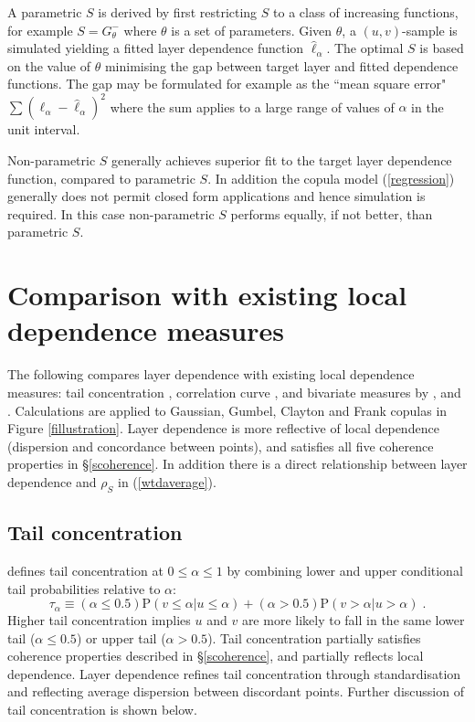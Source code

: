 \documentclass[authoryear]{elsarticle}
\newcommand{\p}{\mathrm{P}}
\newcommand{\eref}[1]{(\ref{#1})}
\newcommand{\fref}[1]{Figure \ref{#1}}
\newcommand{\sref}[1]{\S\ref{#1}}
\begin{document}
A parametric $S$ is derived by first restricting $S$ to a class of increasing functions, for example $S=G^-_\theta$ where $\theta$ is a set of parameters. Given $\theta$, a $(u,v)$-sample is simulated yielding a fitted layer dependence function $\hat{\ell}_\alpha$. The optimal $S$ is based on the value of $\theta$ minimising the gap between target layer and fitted dependence functions. The gap may be formulated for example as the ``mean square error" $\sum (\ell_\alpha-\hat{\ell}_\alpha)^2$ where the sum applies to a large range of values of $\alpha$ in the unit interval.

Non-parametric $S$ generally achieves superior fit to the target layer dependence function, compared to parametric $S$. In addition the copula model \eref{regression} generally does not permit closed form applications and hence simulation is required. In this case non-parametric $S$ performs equally, if not better, than parametric $S$.



\section{Comparison with existing local dependence measures}\label{sliterature}

The following compares layer dependence with existing local dependence measures: tail concentration \citep{venter2002tails}, correlation curve \citep{bjerve1993correlation}, and bivariate measures by \cite{bairamov2003new}, \cite{jones1996local} and \cite{holland1987dependence}. Calculations are applied to Gaussian, Gumbel, Clayton and Frank copulas in \fref{fillustration}. Layer dependence is more reflective of local dependence (dispersion and concordance between points), and satisfies all five coherence properties in \sref{scoherence}. In addition there is a direct relationship between layer dependence and  $\rho_S$ in \eref{wtdaverage}.



\subsection{Tail concentration}

\cite{venter2002tails} defines tail concentration at $0\leq\alpha\leq 1$ by combining lower and upper conditional tail probabilities relative to $\alpha$:
\begin{equation}\label{tailcon}
\tau_\alpha \equiv (\alpha\leq 0.5) \p(v\leq \alpha|u\leq \alpha) + (\alpha>0.5)\p(v>\alpha|u>\alpha) \;.
\end{equation}
Higher tail concentration implies $u$ and $v$ are more likely to fall in the same lower tail ($\alpha\leq 0.5$) or upper tail ($\alpha>0.5$). Tail concentration partially satisfies coherence properties described in \sref{scoherence}, and partially reflects local dependence. Layer dependence refines tail concentration through standardisation and reflecting average dispersion between discordant points. Further discussion of tail concentration is shown below.
\end{document}
